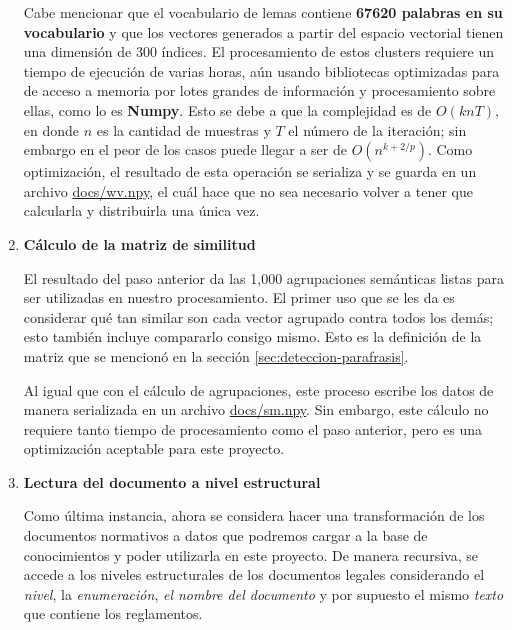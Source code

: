 \begin{enumerate}
    Cabe mencionar que el vocabulario de lemas contiene \textbf{67620 palabras en su vocabulario} y que los vectores generados a partir del espacio vectorial tienen una dimensión de 300 índices. El procesamiento de estos clusters requiere un tiempo de ejecución de varias horas, aún usando bibliotecas optimizadas para de acceso a memoria por lotes grandes de información y procesamiento sobre ellas, como lo es \textbf{Numpy}. Esto se debe a que la complejidad es de $O(knT)$, en donde $n$ es la cantidad de muestras y $T$ el número de la iteración; sin embargo en el peor de los casos puede llegar a ser de $O(n^{k+2/p})$. Como optimización, el resultado de esta operación se serializa y se guarda en un archivo \href{https://github.com/AranGarcia/milo-bot/commit/f2d1df140d4574b6ceda82b9ba4fbb4d9173d80b#diff-931aebaaaa2cf759c308eb067ebc5b9ea29914278192b98e7d0520a576087dbe}{docs/wv.npy}, el cuál hace que no sea necesario volver a tener que calcularla y distribuirla una única vez.
    
    \item \textbf{Cálculo de la matriz de similitud}
    
    El resultado del paso anterior da las 1,000 agrupaciones semánticas listas para ser utilizadas en nuestro procesamiento. El primer uso que se les da es considerar qué tan similar son cada vector agrupado contra todos los demás; esto también incluye compararlo consigo mismo. Esto es la definición de la matriz que se mencionó en la sección \ref{sec:deteccion-parafrasis}.
    
    Al igual que con el cálculo de agrupaciones, este proceso escribe los datos de manera serializada en un archivo \href{https://github.com/AranGarcia/milo-bot/commit/f4f897e0c58e08faeb48df13aedf71241351215e#diff-fb0888c56c64fe00e47679ff9dade943756c12209861ba9232fa0592f0299a63}{docs/sm.npy}. Sin embargo, este cálculo no requiere tanto tiempo de procesamiento como el paso anterior, pero es una optimización aceptable para este proyecto.
    
    \item \textbf{Lectura del documento a nivel estructural}
    
    Como última instancia, ahora se considera hacer una transformación de los documentos normativos a datos que podremos cargar a la base de conocimientos y poder utilizarla en este proyecto. De manera recursiva, se accede a los niveles estructurales de los documentos legales considerando el \textit{nivel}, la \textit{enumeración}, \textit{el nombre del documento} y por supuesto el mismo \textit{texto} que contiene los reglamentos.
    

\end{enumerate}
